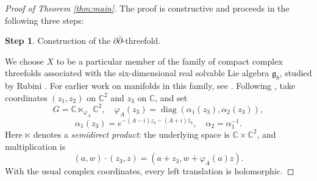 \documentclass[11pt]{amsart}
\newcommand{\C}{\mathbb C}
\newcommand{\ddbar}{\partial\bar\partial}
\numberwithin{equation}{section}
\theoremstyle{definition}
\theoremstyle{plain}
\theoremstyle{plain}
\theoremstyle{definition}
\theoremstyle{stepstyle}
\newtheorem{step}{Step}[section]
\begin{document}
	\begin{proof}[{Proof of Theorem \ref{thm:main}}]
		The proof  is constructive and proceeds in the following three steps:
		
		\begin{step}
			Construction of the $\ddbar$-threefold.
		\end{step}
		We choose $X$ to be a particular member of the family of compact
		complex threefolds associated with the six-dimensional real solvable
		Lie algebra $\mathfrak g_8$, studied by Rubini \cite[\S2.3]{Rubini}.
		For earlier work on manifolds in this family, see
		\cite{Kasuya,Otal,FOU,AK}.  Following \cite[equation (11), p. 8]{Rubini}, take
		coordinates $(z_1,z_2)$ on $\C^2$ and $z_3$ on $\C$, and set
		$$
		G=\C\ltimes_{\varphi_A}\C^2,\quad
		\varphi_A(z_3)=\operatorname{diag}(\alpha_1(z_3),\alpha_2(z_3)),
		$$
		$$
		\alpha_1(z_3)=e^{-(A-i)z_3-(A+i)\bar z_3},\quad
		\alpha_2=\alpha_1^{-1}.
		$$
		Here $\ltimes$ denotes a \emph{semidirect product}: the underlying space is
		$\C\times\C^2$, and multiplication is
		$$
		(a,w)\cdot(z_3,z)=(a+z_3,w+\varphi_A(a)z).
		$$
		With the usual complex coordinates, every left translation is holomorphic.
		

\end{proof}
\end{document}
